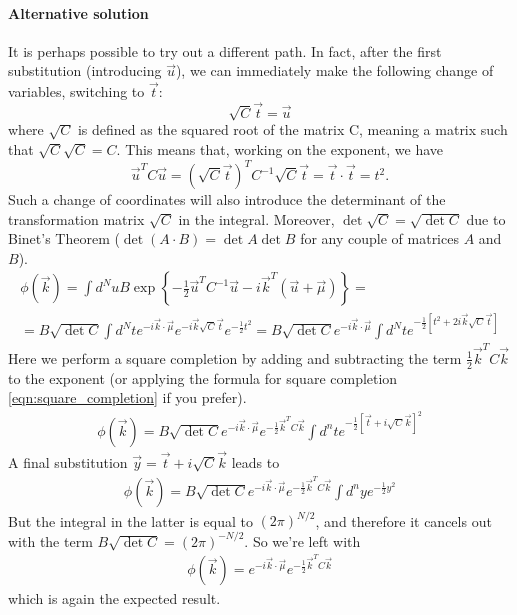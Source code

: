 \documentclass[a4paper,11pt,fleqn]{article}
\begin{document}
\paragraph{Alternative solution}
It is perhaps possible to try out a different path. In fact, after the first substitution (introducing $\vec{u}$), we can immediately
make the following change of variables, switching to $\vec{t}$:
\[
    \sqrt{C}\vec{t} = \vec{u}
\]
where $\sqrt{C}$ is defined as the squared root of the matrix C, meaning a matrix such that $\sqrt{C} \sqrt{C} = C$. This means that,
working on the exponent, we have
\[
\vec{u}^T C \vec{u} = (\sqrt{C}\vec{t})^T C^{-1}\sqrt{C}\vec{t} = \vec{t} \cdot \vec{t} = t^2.
\]
Such a change of coordinates will also introduce the determinant of the transformation matrix $\sqrt{C}$ in the integral. Moreover,
$\det{\sqrt{C}}=\sqrt{\det{C}}$ due to Binet's Theorem ($\det{(A\cdot B)} = \det{A}\det{B}$ for any couple of matrices $A$ and $B$). 
\begin{gather*}
    \phi(\vec{k})= \int d^N u B \exp{\left\{ -\frac{1}{2}\vec{u}^TC^{-1}\vec{u} - i\vec{k}^T(\vec{u}+\vec{\mu}) \right\}} = \\
    = B\sqrt{\det{C}}\int d^N t e^{-i\vec{k}\cdot \vec{\mu}}e^{-i\vec{k}\sqrt{C}\vec{t}}e^{-\frac{1}{2}t^2} = B\sqrt{\det{C}}e^{-i\vec{k}\cdot \vec{\mu}} \int d^N t e^{-\frac{1}{2}[t^2+2i\vec{k}\sqrt{C}\vec{t}]}
\end{gather*}
Here we perform a square completion by adding and subtracting the term $\frac{1}{2}\vec{k}^TC\vec{k}$ to the exponent (or applying the 
formula for square completion \ref{eqn:square_completion} if you prefer).
\begin{gather*}
    \phi(\vec{k}) = B\sqrt{\det{C}} e^{-i\vec{k}\cdot \vec{\mu}}e^{-\frac{1}{2}\vec{k}^T C \vec{k}}\int d^nt e^{-\frac{1}{2}[\vec{t}+i\sqrt{C}\vec{k}]^2}
\end{gather*}
A final substitution $\vec{y}=\vec{t}+i\sqrt{C}\vec{k}$ leads to 
\begin{gather*}
    \phi(\vec{k}) = B\sqrt{\det{C}} e^{-i\vec{k}\cdot \vec{\mu}}e^{-\frac{1}{2}\vec{k}^T C \vec{k}}\int d^ny e^{-\frac{1}{2}y^2}
\end{gather*}
But the integral in the latter is equal to $(2\pi)^{N/2}$, and therefore it cancels out with the term
$B\sqrt{\det{C}}=(2\pi)^{-N/2}$. So we're left with 
\begin{gather*}
    \phi(\vec{k}) = e^{-i\vec{k}\cdot \vec{\mu}}e^{-\frac{1}{2}\vec{k}^T C \vec{k}}
\end{gather*}
which is again the expected result.
\end{document}
